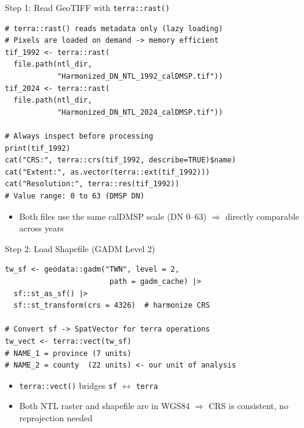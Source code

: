 \documentclass[dvipsnames,hyperref={pdfpagelabels=false}]{beamer}
\begin{document}
\begin{frame}[fragile]{Step 1: Read GeoTIFF with \texttt{terra::rast()}}
\begin{lstlisting}
# terra::rast() reads metadata only (lazy loading)
# Pixels are loaded on demand -> memory efficient
tif_1992 <- terra::rast(
  file.path(ntl_dir,
            "Harmonized_DN_NTL_1992_calDMSP.tif"))
tif_2024 <- terra::rast(
  file.path(ntl_dir,
            "Harmonized_DN_NTL_2024_calDMSP.tif"))

# Always inspect before processing
print(tif_1992)
cat("CRS:", terra::crs(tif_1992, describe=TRUE)$name)
cat("Extent:", as.vector(terra::ext(tif_1992)))
cat("Resolution:", terra::res(tif_1992))
# Value range: 0 to 63 (DMSP DN)
\end{lstlisting}
\begin{itemize}
  \item Both files use the same calDMSP scale (DN 0--63)
        $\Rightarrow$ directly comparable across years
\end{itemize}
\end{frame}


\begin{frame}[fragile]{Step 2: Load Shapefile (GADM Level 2)}
\begin{lstlisting}
tw_sf <- geodata::gadm("TWN", level = 2,
                        path = gadm_cache) |>
  sf::st_as_sf() |>
  sf::st_transform(crs = 4326)  # harmonize CRS

# Convert sf -> SpatVector for terra operations
tw_vect <- terra::vect(tw_sf)
# NAME_1 = province (7 units)
# NAME_2 = county  (22 units) <- our unit of analysis
\end{lstlisting}
\vspace{0.1cm}
\begin{itemize}
  \item \texttt{terra::vect()} bridges \texttt{sf} $\leftrightarrow$ \texttt{terra}
  \vspace{0.2cm}
  \item Both NTL raster and shapefile are in WGS84
        $\Rightarrow$ CRS is consistent, no reprojection needed
\end{itemize}
\end{frame}
\end{document}
